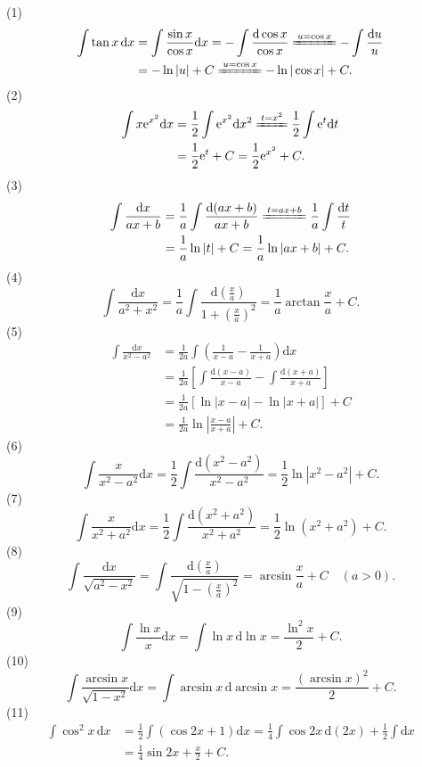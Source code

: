 \begin{solution}
(1)
\begin{align*}
\int\tan x\,\mathrm{d}x&=\int\frac{\sin x}{\cos x}\mathrm{d}x=-\int\frac{\mathrm{d}\cos x}{\cos x}
\xlongequal{u=\cos x}-\int\frac{\mathrm{d}u}{u}\\
&=-\ln|u|+C\xlongequal{u=\cos x}-\ln|\cos x|+C.
\end{align*}
(2)
\begin{align*}
\int x\mathrm{e}^{x^{2}}\mathrm{d}x&=\frac{1}{2}\int\mathrm{e}^{x^{2}}\mathrm{d}x^{2}
\xlongequal{t=x^{2}}\frac{1}{2}\int\mathrm{e}^{t}\mathrm{d}t\\
&=\frac{1}{2}\mathrm{e}^{t}+C=\frac{1}{2}\mathrm{e}^{x^{2}}+C.
\end{align*}
(3)
\begin{align*}
\int\frac{\mathrm{d}x}{ax+b}&=\frac{1}{a}\int\frac{\mathrm{d}(ax+b)}{ax+b}
\xlongequal{t=ax+b}\frac{1}{a}\int\frac{\mathrm{d}t}{t}\\
&=\frac{1}{a}\ln|t|+C=\frac{1}{a}\ln|ax+b|+C.
\end{align*}
(4)
\[
\int\frac{\mathrm{d}x}{a^{2}+x^{2}}=\frac{1}{a}\int\frac{\mathrm{d}\left(\frac{x}{a}\right)}{1+\left(\frac{x}{a}\right)^{2}}
=\frac{1}{a}\arctan\frac{x}{a}+C.
\]
(5)
\begin{align*}
\int\frac{\mathrm{d}x}{x^{2}-a^{2}}&=\frac{1}{2a}\int\left(\frac{1}{x-a}-\frac{1}{x+a}\right)\mathrm{d}x\\
&=\frac{1}{2a}\left[\int\frac{\mathrm{d}(x-a)}{x-a}-\int\frac{\mathrm{d}(x+a)}{x+a}\right]\\
&=\frac{1}{2a}\left[\ln|x-a|-\ln|x+a|\right]+C\\
&=\frac{1}{2a}\ln\left|\frac{x-a}{x+a}\right|+C.
\end{align*}
(6)
\[
\int\frac{x}{x^{2}-a^{2}}\mathrm{d}x=\frac{1}{2}\int\frac{\mathrm{d}(x^{2}-a^{2})}{x^{2}-a^{2}}
=\frac{1}{2}\ln|x^{2}-a^{2}|+C.
\]
(7)
\[
\int\frac{x}{x^{2}+a^{2}}\mathrm{d}x=\frac{1}{2}\int\frac{\mathrm{d}(x^{2}+a^{2})}{x^{2}+a^{2}}
=\frac{1}{2}\ln(x^{2}+a^{2})+C.
\]
(8)
\[
\int\frac{\mathrm{d}x}{\sqrt{a^{2}-x^{2}}}=\int\frac{\mathrm{d}\left(\frac{x}{a}\right)}{\sqrt{1-\left(\frac{x}{a}\right)^{2}}}
=\arcsin\frac{x}{a}+C\quad (a>0).
\]
(9)
\[
\int\frac{\ln x}{x}\mathrm{d}x=\int\ln x\,\mathrm{d}\ln x=\frac{\ln^{2}x}{2}+C.
\]
(10)
\[
\int\frac{\arcsin x}{\sqrt{1-x^{2}}}\mathrm{d}x=\int\arcsin x\,\mathrm{d}\arcsin x=\frac{(\arcsin x)^{2}}{2}+C.
\]
(11)
\begin{align*}
\int\cos^{2}x\,\mathrm{d}x&=\frac{1}{2}\int(\cos 2x+1)\mathrm{d}x
=\frac{1}{4}\int\cos 2x\,\mathrm{d}(2x)+\frac{1}{2}\int\mathrm{d}x\\
&=\frac{1}{4}\sin 2x+\frac{x}{2}+C.
\end{align*}
\end{solution}

